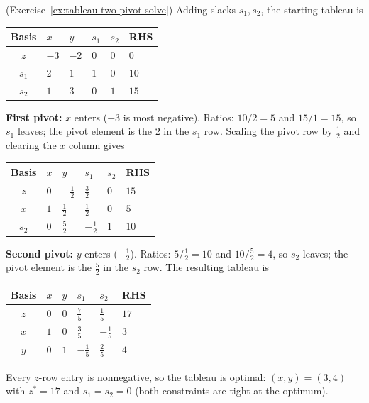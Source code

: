 \begin{solution}(Exercise~\ref{ex:tableau-two-pivot-solve})
Adding slacks $s_1, s_2$, the starting tableau is
\begin{center}
\renewcommand{\arraystretch}{1.3}
\begin{tabular}{c|ZZZZ|Z}
\toprule
Basis & $x$ & $y$ & $s_1$ & $s_2$ & RHS\\
\midrule
$z$   & $-3$ & $-2$ & $0$ & $0$ & $0$\\
\midrule
$s_1$ & $2$ & $1$ & $1$ & $0$ & $10$\\
$s_2$ & $1$ & $3$ & $0$ & $1$ & $15$\\
\bottomrule
\end{tabular}
\end{center}

\textbf{First pivot:} $x$ enters ($-3$ is most negative).  Ratios: $10/2 = 5$ and $15/1 = 15$, so $s_1$ leaves; the pivot element is the $2$ in the $s_1$ row.  Scaling the pivot row by $\tfrac12$ and clearing the $x$ column gives
\begin{center}
\renewcommand{\arraystretch}{1.3}
\begin{tabular}{c|ZZZZ|Z}
\toprule
Basis & $x$ & $y$ & $s_1$ & $s_2$ & RHS\\
\midrule
$z$   & $0$ & $-\tfrac12$ & $\tfrac32$ & $0$ & $15$\\
\midrule
$x$   & $1$ & $\tfrac12$ & $\tfrac12$ & $0$ & $5$\\
$s_2$ & $0$ & $\tfrac52$ & $-\tfrac12$ & $1$ & $10$\\
\bottomrule
\end{tabular}
\end{center}

\textbf{Second pivot:} $y$ enters ($-\tfrac12$).  Ratios: $5/\tfrac12 = 10$ and $10/\tfrac52 = 4$, so $s_2$ leaves; the pivot element is the $\tfrac52$ in the $s_2$ row.  The resulting tableau is
\begin{center}
\renewcommand{\arraystretch}{1.3}
\begin{tabular}{c|ZZZZ|Z}
\toprule
Basis & $x$ & $y$ & $s_1$ & $s_2$ & RHS\\
\midrule
$z$   & $0$ & $0$ & $\tfrac75$ & $\tfrac15$ & $17$\\
\midrule
$x$ & $1$ & $0$ & $\tfrac35$ & $-\tfrac15$ & $3$\\
$y$ & $0$ & $1$ & $-\tfrac15$ & $\tfrac25$ & $4$\\
\bottomrule
\end{tabular}
\end{center}
Every $z$-row entry is nonnegative, so the tableau is optimal: $(x, y) = (3, 4)$ with $z^* = 17$ and $s_1 = s_2 = 0$ (both constraints are tight at the optimum).
\end{solution}
